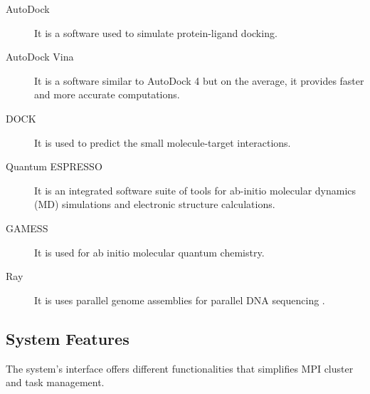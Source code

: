           
          \begin{description}
          	\item[AutoDock] \hfill \break 
            It is a software used to simulate protein-ligand docking\cite{morris2009autodock4}.
            
            \item[AutoDock Vina] \hfill \break
            It is a software similar to AutoDock 4 but on the average, it provides faster and more accurate computations\cite{JCC:JCC21334}. 
            
            
            
            \item[DOCK] \hfill \break
            It is used to predict the small molecule-target interactions\cite{lang2009dock}.
            
            \item[Quantum ESPRESSO] \hfill \break
            It is an integrated software suite of tools for ab-initio molecular dynamics (MD) simulations and electronic structure calculations\cite{QE-2009}.

            \item[GAMESS] \hfill \break
            It is used for ab initio molecular quantum chemistry. \cite{1993gamess}
            
            \item[Ray] \hfill \break
            It is uses parallel genome assemblies for parallel DNA sequencing \cite{boisvert_ray_2012}.
          \end{description}
          
	\subsection{System Features}
	The system's interface offers different functionalities that simplifies MPI cluster and task management.
		
